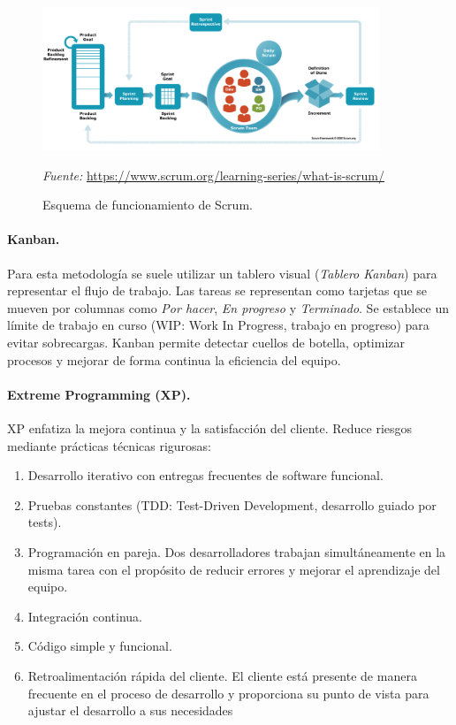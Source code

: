 \begin{figure}[H]
\centering
\includegraphics[width=0.9\textwidth]{./img/methodologies/scrum.png}
\caption{Esquema de funcionamiento de Scrum.}
\label{fig:scrum}
\vspace{0.2em}
{\footnotesize \centering \textit{Fuente:} \url{https://www.scrum.org/learning-series/what-is-scrum/} \par}
\end{figure}

\paragraph{Kanban.} Para esta metodología se suele utilizar un tablero visual (\textit{Tablero Kanban}) para representar el flujo de trabajo. Las tareas se representan como tarjetas que se mueven por columnas como \textit{Por hacer}, \textit{En progreso} y \textit{Terminado}. Se establece un límite de trabajo en curso (WIP: Work In Progress, trabajo en progreso) para evitar sobrecargas. Kanban permite detectar cuellos de botella, optimizar procesos y mejorar de forma continua la eficiencia del equipo.

\paragraph{Extreme Programming (XP).} XP enfatiza la mejora continua y la satisfacción del cliente. Reduce riesgos mediante prácticas técnicas rigurosas:

\begin{enumerate}
    \item Desarrollo iterativo con entregas frecuentes de software funcional.
    \item Pruebas constantes (TDD: Test-Driven Development, desarrollo guiado por tests).
    \item Programación en pareja. Dos desarrolladores trabajan simultáneamente en la misma tarea con el propósito de reducir errores y mejorar el aprendizaje del equipo.
    \item Integración continua.
    \item Código simple y funcional.
    \item Retroalimentación rápida del cliente. El cliente está presente de manera frecuente en el proceso de desarrollo y proporciona su punto de vista para ajustar el desarrollo a sus necesidades
\end{enumerate}

